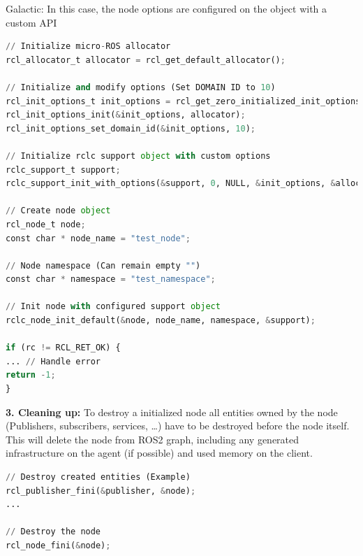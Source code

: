 Galactic: In this case, the node options are configured on the  object with a custom API
\begin{lstlisting}[language=Python, caption=Python example]
// Initialize micro-ROS allocator
rcl_allocator_t allocator = rcl_get_default_allocator();

// Initialize and modify options (Set DOMAIN ID to 10)
rcl_init_options_t init_options = rcl_get_zero_initialized_init_options();
rcl_init_options_init(&init_options, allocator);
rcl_init_options_set_domain_id(&init_options, 10);

// Initialize rclc support object with custom options
rclc_support_t support;
rclc_support_init_with_options(&support, 0, NULL, &init_options, &allocator);

// Create node object
rcl_node_t node;
const char * node_name = "test_node";

// Node namespace (Can remain empty "")
const char * namespace = "test_namespace";

// Init node with configured support object
rclc_node_init_default(&node, node_name, namespace, &support);

if (rc != RCL_RET_OK) {
... // Handle error
return -1;
}
\end{lstlisting}

\textbf{3. Cleaning up:} To destroy a initialized node all entities owned by the node (Publishers, subscribers, services, \dots) have to be destroyed before the node itself. This will delete the node from ROS2 graph, including any generated infrastructure on the agent (if possible) and used memory on the client.
\begin{lstlisting}[language=Python, caption=Python example]
// Destroy created entities (Example)
rcl_publisher_fini(&publisher, &node);
...

// Destroy the node
rcl_node_fini(&node);
\end{lstlisting}

